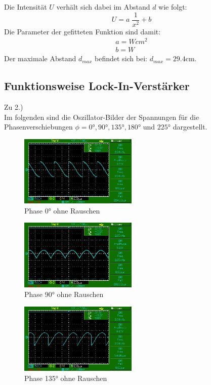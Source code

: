 Die Intensität $U$ verhält sich dabei im Abstand $d$ wie folgt:
\begin{equation*}
    U=a\;\frac{1}{x^2}+b
\end{equation*}
Die Parameter der gefitteten Funktion sind damit:
\begin{align}
    a= Wcm^2\\
    b= W
\end{align}
Der maximale Abstand $d_{max}$ befindet sich bei: $d_{max}=29.4$cm.

\subsection{Funktionsweise Lock-In-Verstärker}
Zu 2.)\\
Im folgenden sind die Oszillator-Bilder der Spannungen für die Phasenverschiebungen $\phi = 0°, 90°, 135°, 180°$ und $225°$ dargestellt.

\begin{figure}
    \centering
    \includegraphics[width=0.5\textwidth]{bilder/MAP001.png}
    \caption{Phase 0° ohne Rauschen}        
    \label{fig:MAP001}
\end{figure}

\begin{figure}
    \centering
    \includegraphics[width=0.5\textwidth]{bilder/MAP002.png}
    \caption{Phase 90° ohne Rauschen}        
    \label{fig:MAP002}
\end{figure}

\begin{figure}
    \centering
    \includegraphics[width=0.5\textwidth]{bilder/MAP005.png}
    \caption{Phase 135° ohne Rauschen}        
    \label{fig:MAP005}
\end{figure}

